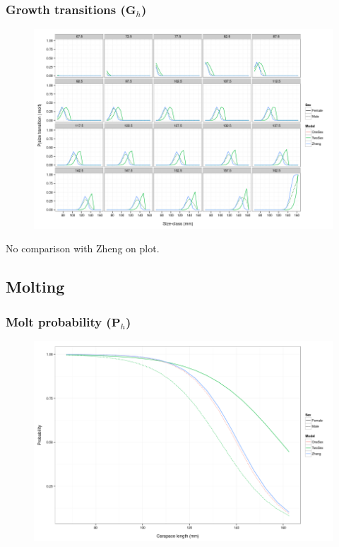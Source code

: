 \documentclass{beamer}
\begin{document}
\begin{frame}
\frametitle{Growth transitions ($\boldsymbol{G}_h$)}
\begin{figure}[!htbp]
  \centering
  \includegraphics[width=0.75\linewidth]{figure/growth_trans-1.png}
\end{figure}
No comparison with Zheng on plot.
\end{frame}


\subsection{Molting}
\begin{frame}
\frametitle{Molt probability ($\boldsymbol{P}_h$)}
\begin{figure}[!htbp]
  \centering
  \includegraphics[width=0.75\linewidth]{figure/molt_prob-1.png}
\end{figure}
\end{frame}

\end{document}

